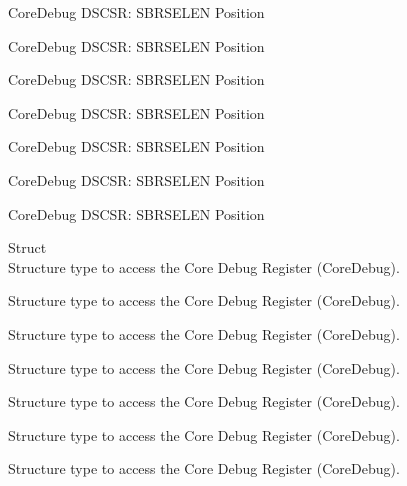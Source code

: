 \begin{DoxyRefList}
\label{deprecated__deprecated000151}%
%
Core\+Debug DSCSR\+: SBRSELEN Position 

\label{deprecated__deprecated000227}%
%
Core\+Debug DSCSR\+: SBRSELEN Position 

\label{deprecated__deprecated000290}%
%
Core\+Debug DSCSR\+: SBRSELEN Position 

\label{deprecated__deprecated000369}%
%
Core\+Debug DSCSR\+: SBRSELEN Position 

\label{deprecated__deprecated000445}%
%
Core\+Debug DSCSR\+: SBRSELEN Position 

\label{deprecated__deprecated000548}%
%
Core\+Debug DSCSR\+: SBRSELEN Position 

\label{deprecated__deprecated000650}%
%
Core\+Debug DSCSR\+: SBRSELEN Position  
\item[Struct \doxylink{struct_core_debug___type}{Core\+Debug\+\_\+\+Type} ]\hfill \\
\label{deprecated__deprecated000004}%
%
Structure type to access the Core Debug Register (Core\+Debug). 

\label{deprecated__deprecated000104}%
%
Structure type to access the Core Debug Register (Core\+Debug). 

\label{deprecated__deprecated000158}%
%
Structure type to access the Core Debug Register (Core\+Debug). 

\label{deprecated__deprecated000243}%
%
Structure type to access the Core Debug Register (Core\+Debug). 

\label{deprecated__deprecated000300}%
%
Structure type to access the Core Debug Register (Core\+Debug). 

\label{deprecated__deprecated000376}%
%
Structure type to access the Core Debug Register (Core\+Debug). 

\label{deprecated__deprecated000455}%
%
Structure type to access the Core Debug Register (Core\+Debug). 


\end{DoxyRefList}
